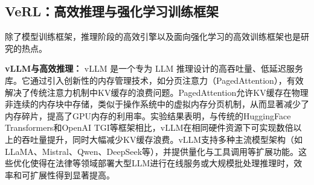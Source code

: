 \documentclass{article}
\begin{document}
\subsection{VeRL：高效推理与强化学习训练框架}
除了模型训练框架，推理阶段的高效引擎以及面向强化学习的高效训练框架也是研究的热点。

\textbf{vLLM与高效推理：} vLLM 是一个专为 LLM 推理设计的高吞吐量、低延迟服务库。它通过引入创新性的内存管理技术，如分页注意力（PagedAttention），有效解决了传统注意力机制中KV缓存的浪费问题。PagedAttention允许KV缓存在物理非连续的内存块中存储，类似于操作系统中的虚拟内存分页机制，从而显著减少了内存碎片，提高了GPU内存的利用率。实验结果表明，与传统的HuggingFace Transformers和OpenAI TGI等框架相比，vLLM在相同硬件资源下可实现数倍以上的吞吐量提升，同时大幅减少KV缓存浪费。vLLM支持多种主流模型架构（如LLaMA、Mistral、Qwen、DeepSeek等），并提供量化与工具调用等扩展功能。这些优化使得在法律等领域部署大型LLM进行在线服务或大规模批处理推理时，效率和可扩展性得到显著提高。
\end{document}
